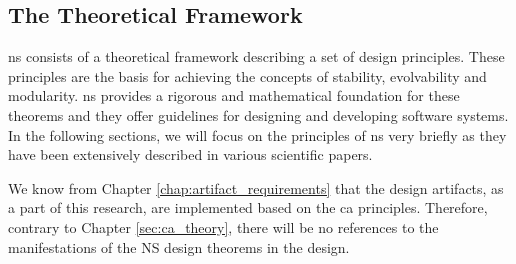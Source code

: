 \subsection{The Theoretical Framework} \label{subsec:ns_desing_theorems}

\gls{ns} consists of a theoretical framework describing a set of design principles. These
principles are the basis for achieving the concepts of stability, evolvability and
modularity. \gls{ns} provides a rigorous and mathematical foundation for these theorems
and they offer guidelines for designing and developing software systems. In the following
sections, we will focus on the principles of \gls{ns} very briefly as they have been
extensively described in various scientific papers.

We know from Chapter \ref{chap:artifact_requirements} that the design artifacts, as a part
of this research, are implemented based on the \gls{ca} principles. Therefore, contrary to
Chapter \ref{sec:ca_theory}, there will be no references to the manifestations of the NS
design theorems in the design.